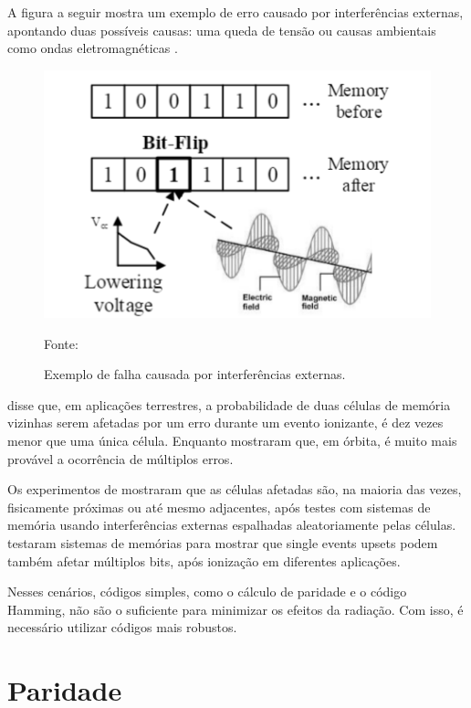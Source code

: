 A figura a seguir mostra um exemplo de erro causado por interferências externas, apontando duas possíveis causas: uma queda de tensão ou causas ambientais como ondas eletromagnéticas \cite{vankeirsbilck2015integration}.

\begin{figure}[ht]
\centering
\includegraphics[scale=0.6]{figuras/error.PNG}
\caption{Exemplo de falha causada por interferências externas.}{Fonte: \cite{vankeirsbilck2015integration}}
\label{fig:error}
\end{figure}

\cite{slayman2005cache} disse que, em aplicações terrestres, a probabilidade de duas células de memória vizinhas serem afetadas por um erro durante um evento ionizante, é dez vezes menor que uma única célula. Enquanto \cite{seifert2008multi} mostraram que, em órbita, é muito mais provável a ocorrência de múltiplos erros. 

Os experimentos de \cite{satoh2000geometric} mostraram que as células afetadas são, na maioria das vezes, fisicamente próximas ou até mesmo adjacentes, após testes com sistemas de memória usando interferências externas espalhadas aleatoriamente pelas células. \cite{lawrence2008single} testaram sistemas de memórias para mostrar que single events upsets podem também afetar múltiplos bits, após ionização em diferentes aplicações.

Nesses cenários, códigos simples, como o cálculo de paridade e o código Hamming, não são o suficiente para minimizar os efeitos da radiação. Com isso, é necessário utilizar códigos mais robustos.

\section{Paridade}

